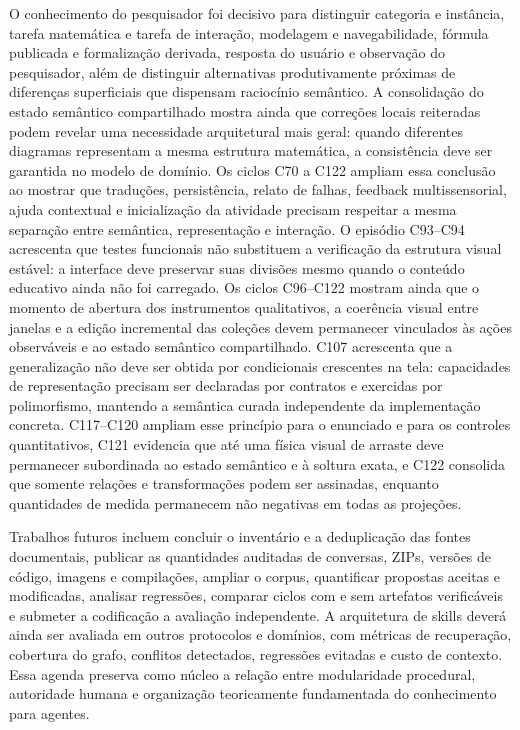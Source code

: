 \documentclass[preprint,12pt,authoryear]{elsarticle}
\begin{document}
O conhecimento do pesquisador foi decisivo para distinguir categoria e instância, tarefa matemática e tarefa de interação, modelagem e navegabilidade, fórmula publicada e formalização derivada, resposta do usuário e observação do pesquisador, além de distinguir alternativas produtivamente próximas de diferenças superficiais que dispensam raciocínio semântico. A consolidação do estado semântico compartilhado mostra ainda que correções locais reiteradas podem revelar uma necessidade arquitetural mais geral: quando diferentes diagramas representam a mesma estrutura matemática, a consistência deve ser garantida no modelo de domínio. Os ciclos C70 a C122 ampliam essa conclusão ao mostrar que traduções, persistência, relato de falhas, feedback multissensorial, ajuda contextual e inicialização da atividade precisam respeitar a mesma separação entre semântica, representação e interação. O episódio C93--C94 acrescenta que testes funcionais não substituem a verificação da estrutura visual estável: a interface deve preservar suas divisões mesmo quando o conteúdo educativo ainda não foi carregado. Os ciclos C96--C122 mostram ainda que o momento de abertura dos instrumentos qualitativos, a coerência visual entre janelas e a edição incremental das coleções devem permanecer vinculados às ações observáveis e ao estado semântico compartilhado. C107 acrescenta que a generalização não deve ser obtida por condicionais crescentes na tela: capacidades de representação precisam ser declaradas por contratos e exercidas por polimorfismo, mantendo a semântica curada independente da implementação concreta. C117--C120 ampliam esse princípio para o enunciado e para os controles quantitativos, C121 evidencia que até uma física visual de arraste deve permanecer subordinada ao estado semântico e à soltura exata, e C122 consolida que somente relações e transformações podem ser assinadas, enquanto quantidades de medida permanecem não negativas em todas as projeções.

Trabalhos futuros incluem concluir o inventário e a deduplicação das fontes documentais, publicar as quantidades auditadas de conversas, ZIPs, versões de código, imagens e compilações, ampliar o corpus, quantificar propostas aceitas e modificadas, analisar regressões, comparar ciclos com e sem artefatos verificáveis e submeter a codificação a avaliação independente. A arquitetura de skills deverá ainda ser avaliada em outros protocolos e domínios, com métricas de recuperação, cobertura do grafo, conflitos detectados, regressões evitadas e custo de contexto. Essa agenda preserva como núcleo a relação entre modularidade procedural, autoridade humana e organização teoricamente fundamentada do conhecimento para agentes.
\end{document}
